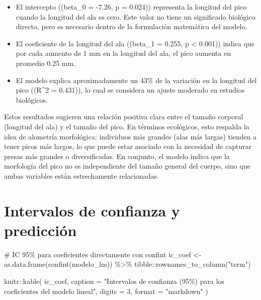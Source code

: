 \documentclass[
  spanish,
  11pt,
  a4paper,
  DIV=11,
  numbers=noendperiod]{scrartcl}
\newenvironment{Shaded}{\begin{snugshade}}{\end{snugshade}}
\newcommand{\AttributeTok}[1]{\textcolor[rgb]{0.40,0.45,0.13}{#1}}
\newcommand{\CommentTok}[1]{\textcolor[rgb]{0.37,0.37,0.37}{#1}}
\newcommand{\DecValTok}[1]{\textcolor[rgb]{0.68,0.00,0.00}{#1}}
\newcommand{\FunctionTok}[1]{\textcolor[rgb]{0.28,0.35,0.67}{#1}}
\newcommand{\NormalTok}[1]{\textcolor[rgb]{0.00,0.23,0.31}{#1}}
\newcommand{\OtherTok}[1]{\textcolor[rgb]{0.00,0.23,0.31}{#1}}
\newcommand{\SpecialCharTok}[1]{\textcolor[rgb]{0.37,0.37,0.37}{#1}}
\newcommand{\StringTok}[1]{\textcolor[rgb]{0.13,0.47,0.30}{#1}}
\begin{document}
\begin{itemize}
\item
  El intercepto ((beta\_0 = -7.26, p = 0.024)) representa la longitud
  del pico cuando la longitud del ala es cero. Este valor no tiene un
  significado biológico directo, pero es necesario dentro de la
  formulación matemática del modelo.
\item
  El coeficiente de la longitud del ala ((beta\_1 = 0.255, p \textless{}
  0.001)) indica que por cada aumento de 1 mm en la longitud del ala, el
  pico aumenta en promedio 0.25 mm.
\item
  El modelo explica aproximadamente un 43\% de la variación en la
  longitud del pico ((R\^{}2 = 0.431)), lo cual se considera un ajuste
  moderado en estudios biológicos.
\end{itemize}

Estos resultados sugieren una relación positiva clara entre el tamaño
corporal (longitud del ala) y el tamaño del pico. En términos
ecológicos, esto respalda la idea de alometría morfológica: individuos
más grandes (alas más largas) tienden a tener picos más largos, lo que
puede estar asociado con la necesidad de capturar presas más grandes o
diversificadas. En conjunto, el modelo indica que la morfología del pico
no es independiente del tamaño general del cuerpo, sino que ambas
variables están estrechamente relacionadas.

\section{Intervalos de confianza y
predicción}\label{intervalos-de-confianza-y-predicciuxf3n}

\begin{Shaded}
\begin{Highlighting}[numbers=left,,]
\CommentTok{\# IC 95\% para coeficientes directamente con confint}
\NormalTok{ic\_coef }\OtherTok{\textless{}{-}} \FunctionTok{as.data.frame}\NormalTok{(}\FunctionTok{confint}\NormalTok{(modelo\_lm)) }\SpecialCharTok{\%\textgreater{}\%}
\NormalTok{  tibble}\SpecialCharTok{::}\FunctionTok{rownames\_to\_column}\NormalTok{(}\StringTok{"term"}\NormalTok{)}

\NormalTok{knitr}\SpecialCharTok{::}\FunctionTok{kable}\NormalTok{(}
\NormalTok{  ic\_coef,}
  \AttributeTok{caption =} \StringTok{"Intervalos de confianza (95\%) }
\StringTok{  para los coeficientes del modelo lineal"}\NormalTok{,}
  \AttributeTok{digits =} \DecValTok{3}\NormalTok{,}
  \AttributeTok{format =} \StringTok{"markdown"}
\NormalTok{)}
\end{Highlighting}
\end{Shaded}
\end{document}
